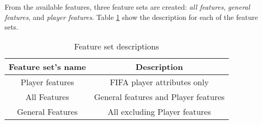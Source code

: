 From the available features, three feature sets are created: \textit{all features}, \textit{general features}, and \textit{player features}. Table \ref{table:featuresetlist} show the description for each of the feature sets.

\begin{table}
    \caption{Feature set descriptions}
    \begin{tabular}{| c | c|}
        \hline
        Feature set's name & Description \\
        \hline
        Player features & FIFA player attributes only \\
        All Features & General features and Player features \\
        General Features & All excluding Player features \\
        \hline
    \end{tabular}
    \label{table:featuresetlist}
\end{table}